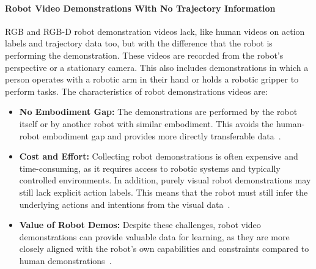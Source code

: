 \paragraph{Robot Video Demonstrations With No Trajectory Information}
RGB and RGB-D robot demonstration videos lack, like human videos on action labels and trajectory data too, but with the difference that the robot is performing the demonstration. These videos are recorded from the robot's perspective or a stationary camera. This also includes demonstrations in which a person operates with a robotic arm in their hand or holds a robotic gripper to perform tasks. The characteristics of robot demonstrations videos are:
\begin{itemize}
	\item \textbf{No Embodiment Gap:} The demonstrations are performed by the robot itself or by another robot with similar embodiment. This avoids the human-robot embodiment gap and provides more directly transferable data~\cite{McCarthy_2025}. 
	\item \textbf{Cost and Effort:} Collecting robot demonstrations is often expensive and time-consuming, as it requires access to robotic systems and typically controlled environments. In addition, purely visual robot demonstrations may still lack explicit action labels. This means that the robot must still infer the underlying actions and intentions from the visual data~\cite{McCarthy_2025}. 
	\item \textbf{Value of Robot Demos:} Despite these challenges, robot video demonstrations can provide valuable data for learning, as they are more closely aligned with the robot's own capabilities and constraints compared to human demonstrations~\cite{McCarthy_2025}.
\end{itemize}



